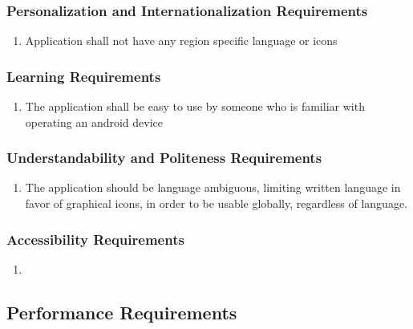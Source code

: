 \documentclass[]{article}
\begin{document}
\subsubsection{Personalization and Internationalization Requirements}
\label{ssub:personalization_and_internationalization_requirements}
\begin{enumerate}[{UH}1. ]
	\item Application shall not have any region specific language or icons
\end{enumerate}

\subsubsection{Learning Requirements}
\label{ssub:learning_requirements}
\begin{enumerate}[{UH}1. ]
	\item The application shall be easy to use by someone who is familiar with operating an android device
\end{enumerate}

\subsubsection{Understandability and Politeness Requirements}
\label{ssub:understandability_and_politeness_requirements}
\begin{enumerate}[{UH}1. ]
	\item The application should be language ambiguous, limiting written language in favor of graphical icons, in order to be usable globally, regardless of language.
\end{enumerate}

\subsubsection{Accessibility Requirements}
\label{ssub:accessibility_requirements}
\begin{enumerate}[{UH}1. ]
	\item 
\end{enumerate}


\subsection{Performance Requirements}
\label{sub:performance_requirements}
\end{document}
